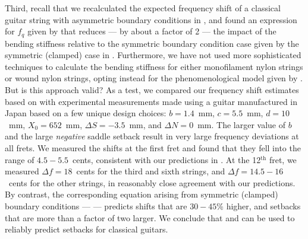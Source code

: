 Third, recall that we recalculated the expected frequency shift of a classical guitar string with asymmetric boundary conditions in , and found an expression for $f_q$ given by  that reduces --- by about a factor of 2 --- the impact of the bending stiffness relative to the symmetric boundary condition case given by the symmetric (clamped) case in . Furthermore, we have not used more sophisticated techniques to calculate the bending stiffness for either monofilament nylon strings or wound nylon strings, opting instead for the phenomenological model given by . But is this approach valid? As a test, we compared our frequency shift estimates based on  with experimental measurements made using a guitar manufactured in Japan based on a few unique design choices: $b = 1.4$~mm, $c = 5.5$~mm, $d = 10$~mm, $X_0 = 652$~mm, $\Delta S = -3.5$~mm, and $\Delta N = 0$~mm. The larger value of $b$ and the large \emph{negative} saddle setback result in very large frequency deviations at all frets. We measured the shifts at the first fret and found that they fell into the range of $4.5 - 5.5$~cents, consistent with our predictions in . At the 12$^\mathrm{th}$ fret, we measured $\Delta f = 18$~cents for the third and sixth strings, and $\Delta f = 14.5 - 16$~cents for the other strings, in reasonably close agreement with our predictions. By contrast, the corresponding equation arising from symmetric (clamped) boundary conditions ---  --- predicts shifts that are $30 - 45$\% higher, and setbacks that are more than a factor of two larger. We conclude that  and  can be used to reliably predict setbacks for classical guitars.

